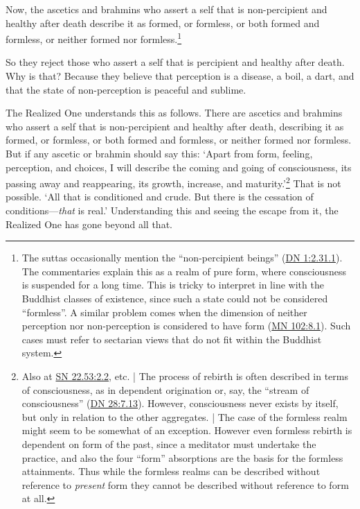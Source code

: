 \documentclass[12pt,openany]{book}%
\begin{document}
Now, the ascetics and brahmins who assert a self that is non-percipient and healthy after death describe it as formed, or formless, or both formed and formless, or neither formed nor formless.\footnote{The suttas occasionally mention the “non-percipient beings” (\href{https://suttacentral.net/dn1/en/sujato\#2.31.1}{DN 1:2.31.1}). The commentaries explain this as a realm of pure form, where consciousness is suspended for a long time. This is tricky to interpret in line with the Buddhist classes of existence, since such a state could not be considered “formless”. A similar problem comes when the dimension of neither perception nor non-perception is considered to have form (\href{https://suttacentral.net/mn102/en/sujato\#8.1}{MN 102:8.1}). Such cases must refer to sectarian views that do not fit within the Buddhist system. } 

So they reject those who assert a self that is percipient and healthy after death. Why is that? Because they believe that perception is a disease, a boil, a dart, and that the state of non-perception is peaceful and sublime. 

The Realized One understands this as follows. There are ascetics and brahmins who assert a self that is non-percipient and healthy after death, describing it as formed, or formless, or both formed and formless, or neither formed nor formless. But if any ascetic or brahmin should say this: ‘Apart from form, feeling, perception, and choices, I will describe the coming and going of consciousness, its passing away and reappearing, its growth, increase, and maturity.’\footnote{Also at \href{https://suttacentral.net/sn22.53/en/sujato\#2.2}{SN 22.53:2.2}, etc. | The process of rebirth is often described in terms of consciousness, as in dependent origination or, say, the “stream of consciousness” (\href{https://suttacentral.net/dn28/en/sujato\#7.13}{DN 28:7.13}). However, consciousness never exists by itself, but only in relation to the other aggregates. | The case of the formless realm might seem to be somewhat of an exception. However even formless rebirth is dependent on form of the past, since a meditator must undertake the practice, and also the four “form” absorptions are the basis for the formless attainments. Thus while the formless realms can be described without reference to \emph{present} form they cannot be described without reference to form at all. } That is not possible. ‘All that is conditioned and crude. But there is the cessation of conditions—\emph{that} is real.’ Understanding this and seeing the escape from it, the Realized One has gone beyond all that. 
\end{document}
